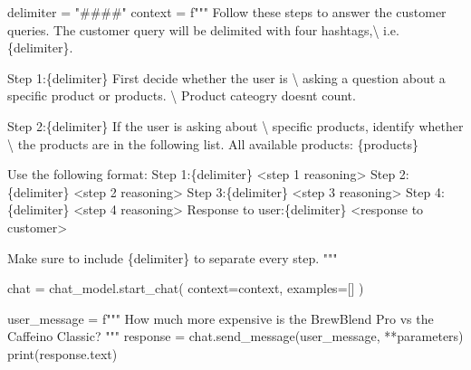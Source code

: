 \documentclass[
  letterpaper,
  DIV=11,
  numbers=noendperiod]{scrreprt}
\newenvironment{Shaded}{\begin{snugshade}}{\end{snugshade}}
\newcommand{\BuiltInTok}[1]{\textcolor[rgb]{0.00,0.23,0.31}{#1}}
\newcommand{\CharTok}[1]{\textcolor[rgb]{0.13,0.47,0.30}{#1}}
\newcommand{\NormalTok}[1]{\textcolor[rgb]{0.00,0.23,0.31}{#1}}
\newcommand{\OperatorTok}[1]{\textcolor[rgb]{0.37,0.37,0.37}{#1}}
\newcommand{\SpecialCharTok}[1]{\textcolor[rgb]{0.37,0.37,0.37}{#1}}
\newcommand{\SpecialStringTok}[1]{\textcolor[rgb]{0.13,0.47,0.30}{#1}}
\newcommand{\StringTok}[1]{\textcolor[rgb]{0.13,0.47,0.30}{#1}}
\begin{document}
\begin{Shaded}
\begin{Highlighting}[]
\NormalTok{delimiter }\OperatorTok{=} \StringTok{"\#\#\#\#"}
\NormalTok{context }\OperatorTok{=} \SpecialStringTok{f"""}
\SpecialStringTok{Follow these steps to answer the customer queries.}
\SpecialStringTok{The customer query will be delimited with four hashtags,}\CharTok{\textbackslash{}}
\SpecialStringTok{i.e. }\SpecialCharTok{\{}\NormalTok{delimiter}\SpecialCharTok{\}}\SpecialStringTok{.}

\SpecialStringTok{Step 1:}\SpecialCharTok{\{}\NormalTok{delimiter}\SpecialCharTok{\}}\SpecialStringTok{ First decide whether the user is }\CharTok{\textbackslash{}}
\SpecialStringTok{asking a question about a specific product or products. }\CharTok{\textbackslash{}}
\SpecialStringTok{Product cateogry doesn\textquotesingle{}t count.}

\SpecialStringTok{Step 2:}\SpecialCharTok{\{}\NormalTok{delimiter}\SpecialCharTok{\}}\SpecialStringTok{ If the user is asking about }\CharTok{\textbackslash{}}
\SpecialStringTok{specific products, identify whether }\CharTok{\textbackslash{}}
\SpecialStringTok{the products are in the following list.}
\SpecialStringTok{All available products:}
\SpecialCharTok{\{}\NormalTok{products}\SpecialCharTok{\}}

\SpecialStringTok{Use the following format:}
\SpecialStringTok{Step 1:}\SpecialCharTok{\{}\NormalTok{delimiter}\SpecialCharTok{\}}\SpecialStringTok{ \textless{}step 1 reasoning\textgreater{}}
\SpecialStringTok{Step 2:}\SpecialCharTok{\{}\NormalTok{delimiter}\SpecialCharTok{\}}\SpecialStringTok{ \textless{}step 2 reasoning\textgreater{}}
\SpecialStringTok{Step 3:}\SpecialCharTok{\{}\NormalTok{delimiter}\SpecialCharTok{\}}\SpecialStringTok{ \textless{}step 3 reasoning\textgreater{}}
\SpecialStringTok{Step 4:}\SpecialCharTok{\{}\NormalTok{delimiter}\SpecialCharTok{\}}\SpecialStringTok{ \textless{}step 4 reasoning\textgreater{}}
\SpecialStringTok{Response to user:}\SpecialCharTok{\{}\NormalTok{delimiter}\SpecialCharTok{\}}\SpecialStringTok{ \textless{}response to customer\textgreater{}}

\SpecialStringTok{Make sure to include }\SpecialCharTok{\{}\NormalTok{delimiter}\SpecialCharTok{\}}\SpecialStringTok{ to separate every step.}
\SpecialStringTok{"""}
\end{Highlighting}
\end{Shaded}

\begin{Shaded}
\begin{Highlighting}[]
\NormalTok{chat }\OperatorTok{=}\NormalTok{ chat\_model.start\_chat(}
\NormalTok{    context}\OperatorTok{=}\NormalTok{context,}
\NormalTok{    examples}\OperatorTok{=}\NormalTok{[]}
\NormalTok{)}

\NormalTok{user\_message }\OperatorTok{=} \SpecialStringTok{f"""}
\SpecialStringTok{How much more expensive is the BrewBlend Pro vs the Caffeino Classic?}
\SpecialStringTok{"""}
\NormalTok{response }\OperatorTok{=}\NormalTok{ chat.send\_message(user\_message, }\OperatorTok{**}\NormalTok{parameters)}
\BuiltInTok{print}\NormalTok{(response.text)}
\end{Highlighting}
\end{Shaded}
\end{document}
